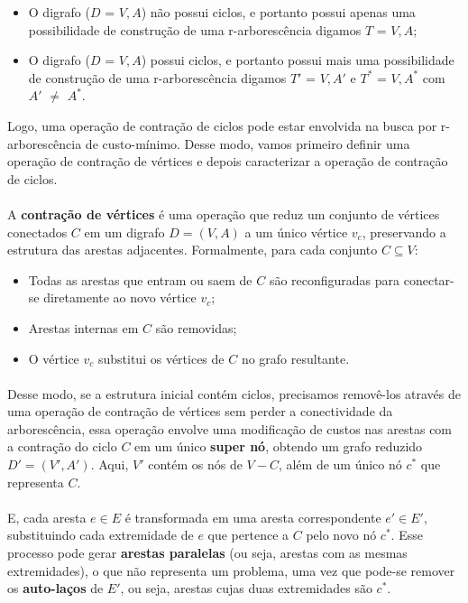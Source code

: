 \documentclass[12pt,a4paper]{article}
\begin{document}
\begin{itemize}
    \item O digrafo (\( D \) = \( V, A \)) não possui ciclos, e portanto possui apenas uma possibilidade de construção de uma r-arborescência digamos \( T \) = \( V, A \);
    \item O digrafo (\( D \) = \( V, A \)) possui ciclos, e portanto possui mais uma possibilidade de construção de uma r-arborescência digamos \( T' \) = \( V, A' \) e \( T^* \) = \( V, A^* \) com \(A' \) \(\neq\) \(A^* \).

\end{itemize}
Logo, uma operação de contração de ciclos pode estar envolvida na busca por r-arborescência de custo-mínimo. Desse modo, vamos primeiro definir uma operação de contração de vértices e depois caracterizar a operação de contração de ciclos.

\paragraph{}
A \textbf{contração de vértices} é uma operação que reduz um conjunto de vértices conectados \(C\) em um digrafo \(D = (V, A)\) a um único vértice \(v_c\), preservando a estrutura das arestas adjacentes. Formalmente, para cada conjunto \(C \subseteq V\):
\begin{itemize}
    \item Todas as arestas que entram ou saem de \(C\) são reconfiguradas para conectar-se diretamente ao novo vértice \(v_c\);
    \item Arestas internas em \(C\) são removidas;
    \item O vértice \(v_c\) substitui os vértices de \(C\) no grafo resultante.
\end{itemize}

\paragraph{}
Desse modo, se a estrutura inicial contém ciclos, precisamos removê-los através de uma operação de contração de vértices sem perder a conectividade da arborescência, essa operação envolve uma modificação de custos nas arestas com a contração do ciclo \( C \) em um único \textbf{super nó}, obtendo um grafo reduzido \( D' = (V', A') \). Aqui, \( V' \) contém os nós de \( V - C \), além de um único nó \( c^* \) que representa \( C \).

\paragraph{}
E, cada aresta \( e \in E \)  é transformada em uma aresta correspondente \( e' \in E' \), substituindo cada extremidade de \( e \) que pertence a \( C \) pelo novo nó \( c^* \). Esse processo pode gerar \textbf{arestas paralelas} (ou seja, arestas com as mesmas extremidades), o que não representa um problema, uma vez que pode-se remover os \textbf{auto-laços} de \( E' \), ou seja, arestas cujas duas extremidades são \( c^* \).
\end{document}
